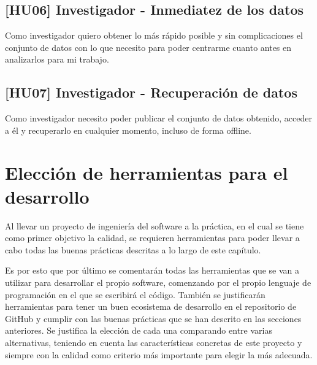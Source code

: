 \subsection{[HU06] Investigador - Inmediatez de los datos}
Como investigador quiero obtener lo más rápido posible y sin complicaciones el
conjunto de datos con lo que necesito para poder centrarme cuanto antes en
analizarlos para mi trabajo.

\subsection{[HU07] Investigador - Recuperación de datos}
Como investigador necesito poder publicar el conjunto de datos obtenido, acceder
a él y recuperarlo en cualquier momento, incluso de forma offline.



\section{Elección de herramientas para el desarrollo}
Al llevar un proyecto de ingeniería del software a la práctica, en el cual se
tiene como primer objetivo la calidad, se requieren herramientas para poder
llevar a cabo todas las buenas prácticas descritas a lo largo de este capítulo. 

Es por esto que por último se comentarán todas las herramientas que se van a
utilizar para desarrollar el propio software, comenzando por el propio lenguaje
de programación en el que se escribirá el código. También se justificarán
herramientas para tener un buen ecosistema de desarrollo en el repositorio de
GitHub y cumplir con las buenas prácticas que se han descrito en las secciones
anteriores. Se justifica la elección de cada una comparando entre varias
alternativas, teniendo en cuenta las características concretas de este proyecto
y siempre con la calidad como criterio más importante para elegir la más
adecuada.

